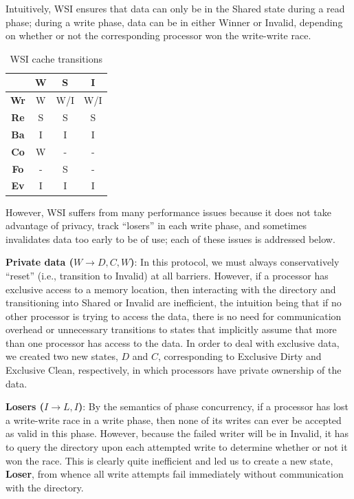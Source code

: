 \documentclass{article}
\begin{document}
Intuitively, WSI ensures that data can only be in the Shared state during a read phase; during a write phase, data can be in either Winner or Invalid, depending on whether or not the corresponding processor won the write-write race. 

\begin{table}[H]
\centering
\caption{WSI cache transitions}
\label{wsi-cache-protocol}
\begin{tabular}{|c|c|c|c|}
\hline
 & \textbf{W} & \textbf{S} & \textbf{I} \\ \hline
\textbf{Wr} & W & W/I & W/I \\ \hline
\textbf{Re} & S & S & S \\ \hline
\textbf{Ba} & I & I & I \\ \hline
\textbf{Co} & W & - & - \\ \hline
\textbf{Fo} & - & S & - \\ \hline
\textbf{Ev} & I & I & I \\ \hline
\end{tabular}
\end{table}

However, WSI suffers from many performance issues because it does not take advantage of privacy, track ``losers'' in each write phase, and sometimes invalidates data too early to be of use; each of these issues is addressed below.

\textbf{Private data ($W \rightarrow D, C, W$)}:
In this protocol, we must always conservatively ``reset'' (i.e., transition to Invalid) at all barriers. However, if a processor has exclusive access to a memory location, then interacting with the directory and transitioning into Shared or Invalid are inefficient, the intuition being that if no other processor is trying to access the data, there is no need for communication overhead or unnecessary transitions to states that implicitly assume that more than one processor has access to the data. In order to deal with exclusive data, we created two new states, $D$ and $C$, corresponding to Exclusive Dirty and Exclusive Clean, respectively, in which processors have private ownership of the data.

\textbf{Losers ($I \rightarrow L, I$)}: 
By the semantics of phase concurrency, if a processor has lost a write-write race in a write phase, then none of its writes can ever be accepted as valid in this phase. However, because the failed writer will be in Invalid, it has to query the directory upon each attempted write to determine whether or not it won the race. This is clearly quite inefficient and led us to create a new state, \textbf{Loser}, from whence all write attempts fail immediately without communication with the directory.
\end{document}
